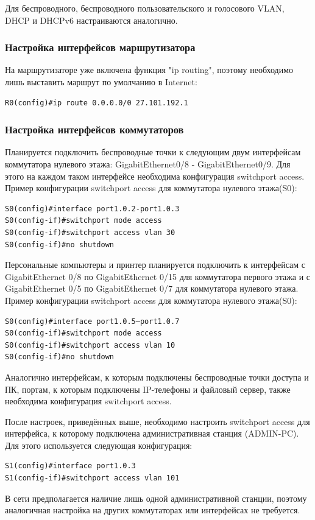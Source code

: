     Для беспроводного, беспроводного пользовательского и голосового VLAN,
    DHCP и DHCPv6 настраиваются аналогично.

    \subsubsection{Настройка интерфейсов маршрутизатора}
    На маршрутизаторе уже включена функция "ip routing", поэтому необходимо лишь выставить маршрут по умолчанию в Internet:
\begin{lstlisting}
R0(config)#ip route 0.0.0.0/0 27.101.192.1
\end{lstlisting}

    \subsubsection{Настройка интерфейсов коммутаторов}
    Планируется подключить беспроводные точки к следующим двум интерфейсам коммутатора нулевого этажа:
    GigabitEthernet0/8 - GigabitEthernet0/9.
    Для этого на каждом таком интерфейсе необходима конфигурация switchport access.
    Пример конфигурации switchport access для коммутатора нулевого этажа(S0):
\begin{lstlisting}
S0(config)#interface port1.0.2-port1.0.3
S0(config-if)#switchport mode access
S0(config-if)#switchport access vlan 30
S0(config-if)#no shutdown
\end{lstlisting}

Персональные компьютеры и принтер планируется подключить к интерфейсам с
GigabitEthernet 0/8 по GigabitEthernet 0/15 для коммутатора первого этажа
и с GigabitEthernet 0/5 по GigabitEthernet 0/7 для коммутатора нулевого этажа.
Пример конфигурации switchport access для коммутатора нулевого этажа(S0):
\begin{lstlisting}
S0(config)#interface port1.0.5–port1.0.7
S0(config-if)#switchport mode access
S0(config-if)#switchport access vlan 10
S0(config-if)#no shutdown
\end{lstlisting}

Аналогично интерфейсам, к которым подключены беспроводные точки доступа и ПК,
портам, к которым подключены IP-телефоны и файловый сервер, также необходима конфигурация switchport access.

После настроек, приведённых выше, необходимо настроить switchport access для интерфейса,
к которому подключена административная станция (ADMIN-PC).
Для этого используется следующая конфигурация:
\begin{lstlisting}
S1(config)#interface port1.0.3
S1(config-if)#switchport access vlan 101
\end{lstlisting}
В сети предполагается наличие лишь одной административной станции,
поэтому аналогичная настройка на других коммутаторах или интерфейсах не требуется.


